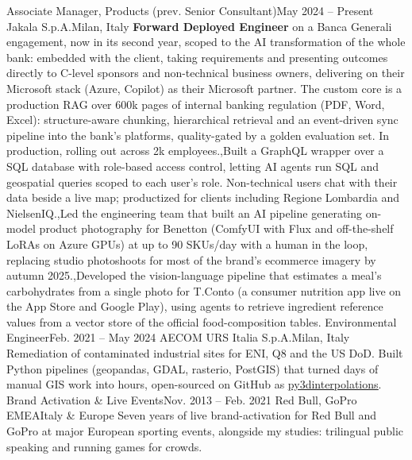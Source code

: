 \documentclass[letterpaper,11pt]{article}
\begin{document}
\begin{sectionElementsList}
  \experienceElement
  {Associate Manager, Products (prev. Senior Consultant)}{May 2024 -- Present}
  {Jakala S.p.A.}{Milan, Italy}
  {}
  {{\textbf{Forward Deployed Engineer} on a Banca Generali engagement, now in its second year, scoped to the AI transformation of the whole bank: embedded with the client, taking requirements and presenting outcomes directly to C-level sponsors and non-technical business owners, delivering on their Microsoft stack (Azure, Copilot) as their Microsoft partner. The custom core is a production RAG over 600k pages of internal banking regulation (PDF, Word, Excel): structure-aware chunking, hierarchical retrieval and an event-driven sync pipeline into the bank's platforms, quality-gated by a golden evaluation set. In production, rolling out across 2k employees.},{Built a GraphQL wrapper over a SQL database with role-based access control, letting AI agents run SQL and geospatial queries scoped to each user's role. Non-technical users chat with their data beside a live map; productized for clients including Regione Lombardia and NielsenIQ.},{Led the engineering team that built an AI pipeline generating on-model product photography for Benetton (ComfyUI with Flux and off-the-shelf LoRAs on Azure GPUs) at up to 90 SKUs/day with a human in the loop, replacing studio photoshoots for most of the brand's ecommerce imagery by autumn 2025.},{Developed the vision-language pipeline that estimates a meal's carbohydrates from a single photo for T.Conto (a consumer nutrition app live on the App Store and Google Play), using agents to retrieve ingredient reference values from a vector store of the official food-composition tables.}}
  \experienceElement
  {Environmental Engineer}{Feb. 2021 -- May 2024}
  {AECOM URS Italia S.p.A.}{Milan, Italy}
  {Remediation of contaminated industrial sites for ENI, Q8 and the US DoD.}
  {{Built Python pipelines (geopandas, GDAL, rasterio, PostGIS) that turned days of manual GIS work into hours, open-sourced on GitHub as \href{https://github.com/giocaizzi/py3dinterpolations}{\underline{py3dinterpolations}}.}}
  \experienceElement
  {Brand Activation \& Live Events}{Nov. 2013 -- Feb. 2021}
  {Red Bull, GoPro EMEA}{Italy \& Europe}
  {Seven years of live brand-activation for Red Bull and GoPro at major European sporting events, alongside my studies: trilingual public speaking and running games for crowds.}
  {}
\end{sectionElementsList}

\end{document}
